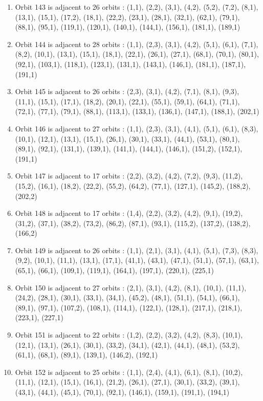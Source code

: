 \documentclass[12pt]{article}
\begin{document}
\begin{enumerate}
\item Orbit 143 is adjacent to 26 orbits : (1,1), (2,2), (3,1), (4,2), (5,2), (7,2), (8,1), (13,1), (15,1), (17,2), (18,1), (22,2), (23,1), (28,1), (32,1), (62,1), (79,1), (88,1), (95,1), (119,1), (120,1), (140,1), (144,1), (156,1), (181,1), (189,1)
\item Orbit 144 is adjacent to 28 orbits : (1,1), (2,3), (3,1), (4,2), (5,1), (6,1), (7,1), (8,2), (10,1), (13,1), (15,1), (18,1), (22,1), (26,1), (27,1), (68,1), (70,1), (80,1), (92,1), (103,1), (118,1), (123,1), (131,1), (143,1), (146,1), (181,1), (187,1), (191,1)
\item Orbit 145 is adjacent to 26 orbits : (2,3), (3,1), (4,2), (7,1), (8,1), (9,3), (11,1), (15,1), (17,1), (18,2), (20,1), (22,1), (55,1), (59,1), (64,1), (71,1), (72,1), (77,1), (79,1), (88,1), (113,1), (133,1), (136,1), (147,1), (188,1), (202,1)
\item Orbit 146 is adjacent to 27 orbits : (1,1), (2,3), (3,1), (4,1), (5,1), (6,1), (8,3), (10,1), (12,1), (13,1), (15,1), (26,1), (30,1), (33,1), (44,1), (53,1), (80,1), (89,1), (92,1), (131,1), (139,1), (141,1), (144,1), (146,1), (151,2), (152,1), (191,1)
\item Orbit 147 is adjacent to 17 orbits : (2,2), (3,2), (4,2), (7,2), (9,3), (11,2), (15,2), (16,1), (18,2), (22,2), (55,2), (64,2), (77,1), (127,1), (145,2), (188,2), (202,2)
\item Orbit 148 is adjacent to 17 orbits : (1,4), (2,2), (3,2), (4,2), (9,1), (19,2), (31,2), (37,1), (38,2), (73,2), (86,2), (87,1), (93,1), (115,2), (137,2), (138,2), (166,2)
\item Orbit 149 is adjacent to 26 orbits : (1,1), (2,1), (3,1), (4,1), (5,1), (7,3), (8,3), (9,2), (10,1), (11,1), (13,1), (17,1), (41,1), (43,1), (47,1), (51,1), (57,1), (63,1), (65,1), (66,1), (109,1), (119,1), (164,1), (197,1), (220,1), (225,1)
\item Orbit 150 is adjacent to 27 orbits : (2,1), (3,1), (4,2), (8,1), (10,1), (11,1), (24,2), (28,1), (30,1), (33,1), (34,1), (45,2), (48,1), (51,1), (54,1), (66,1), (89,1), (97,1), (107,2), (108,1), (114,1), (122,1), (128,1), (217,1), (218,1), (223,1), (227,1)
\item Orbit 151 is adjacent to 22 orbits : (1,2), (2,2), (3,2), (4,2), (8,3), (10,1), (12,1), (13,1), (26,1), (30,1), (33,2), (34,1), (42,1), (44,1), (48,1), (53,2), (61,1), (68,1), (89,1), (139,1), (146,2), (192,1)
\item Orbit 152 is adjacent to 25 orbits : (1,1), (2,4), (4,1), (6,1), (8,1), (10,2), (11,1), (12,1), (15,1), (16,1), (21,2), (26,1), (27,1), (30,1), (33,2), (39,1), (43,1), (44,1), (45,1), (70,1), (92,1), (146,1), (159,1), (191,1), (194,1)

\end{enumerate}
\end{document}
